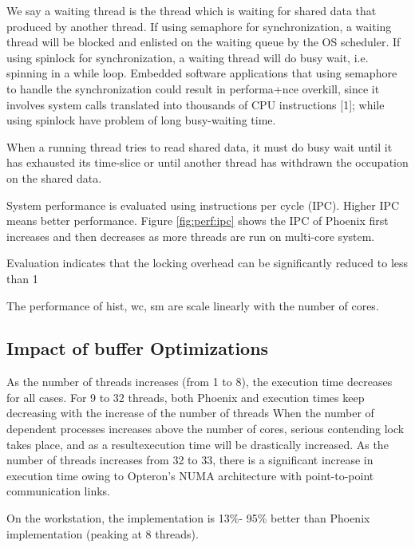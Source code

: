 We say a waiting thread is the thread which is waiting for shared
data that produced by another thread. If using semaphore for
synchronization, a waiting thread will be blocked and enlisted
on the waiting queue by the OS scheduler. If using spinlock
for synchronization, a waiting thread will do busy wait, i.e.
spinning in a while loop. Embedded software applications
that using semaphore to handle the synchronization could
result in performa+nce overkill, since it involves system calls
translated into thousands of CPU instructions [1]; while using
spinlock have problem of long busy-waiting time.

When a running thread tries to read shared data,
it must do busy wait until it has exhausted its time-slice
or until another thread has withdrawn the occupation on the
shared data. 




System performance is evaluated using
instructions per cycle (IPC). Higher IPC means
better performance.
Figure \ref{fig:perf:ipc} shows the IPC of Phoenix first increases 
and then decreases as more threads are run on multi-core system.


{\color{red}\myds }
Evaluation indicates that
the locking overhead can be significantly reduced to less
than 1%





The performance of hist, wc, sm are scale linearly with the number of cores.


\subsection{ Impact of buffer Optimizations}
As the number of threads increases (from 1 to 8), the
execution time decreases for all cases. For 9 to 32 threads,
both Phoenix and \myds execution times keep decreasing with
the increase of the number of threads
When the number of dependent processes increases above the
number of cores, 
serious contending lock takes place,
and as a resultexecution time will be drastically increased. 
As the number of threads increases from 32 to 33, 
there is a significant increase
in execution time owing to Opteron’s NUMA architecture with
point-to-point communication links.

On the workstation, the \myds implementation is 13\%-
95\% better than Phoenix implementation (peaking at 8
threads).

